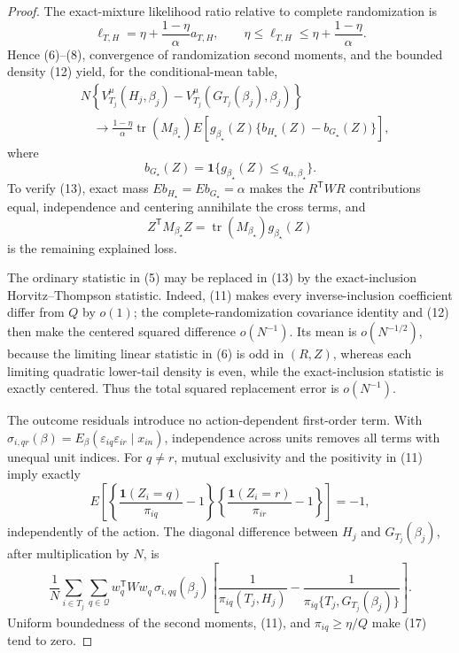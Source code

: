 \documentclass{article}
\begin{document}
\begin{proof}
The exact-mixture likelihood ratio relative to complete randomization is
\[
\ell_{T,H}=\eta+\frac{1-\eta}{\alpha}a_{T,H},
\qquad
\eta\leq\ell_{T,H}\leq\eta+\frac{1-\eta}{\alpha}.
\tag{12}
\]
Hence (6)--(8), convergence of randomization second moments, and the bounded density (12) yield, for the conditional-mean table,
\[
\begin{aligned}
&N\left\{
V_{T_j}^{\mu}(H_j,\beta_j)
-V_{T_j}^{\mu}(G_{T_j}(\beta_j),\beta_j)
\right\}\\
&\quad\longrightarrow
\frac{1-\eta}{\alpha}\operatorname{tr}(M_{\beta_\star})
E\!\left[
g_{\beta_\star}(Z)
\{b_{H_\star}(Z)-b_{G_\star}(Z)\}
\right],
\end{aligned}
\tag{13}
\]
where
\[
b_{G_\star}(Z)
=\mathbf 1\{g_{\beta_\star}(Z)
\leq q_{\alpha,\beta_\star}\}.
\tag{14}
\]
To verify (13), exact mass \(E b_{H_\star}=E b_{G_\star}=\alpha\) makes the \(R^{\mathsf T}WR\) contributions equal, independence and centering annihilate the cross terms, and
\[
Z^{\mathsf T}M_{\beta_\star}Z
=\operatorname{tr}(M_{\beta_\star})g_{\beta_\star}(Z)
\tag{15}
\]
is the remaining explained loss.

The ordinary statistic in (5) may be replaced in (13) by the exact-inclusion Horvitz--Thompson statistic.  Indeed, (11) makes every inverse-inclusion coefficient differ from \(Q\) by \(o(1)\); the complete-randomization covariance identity and (12) then make the centered squared difference \(o(N^{-1})\).  Its mean is \(o(N^{-1/2})\), because the limiting linear statistic in (6) is odd in \((R,Z)\), whereas each limiting quadratic lower-tail density is even, while the exact-inclusion statistic is exactly centered.  Thus the total squared replacement error is \(o(N^{-1})\).

The outcome residuals introduce no action-dependent first-order term.  With
\(\sigma_{i,qr}(\beta)=E_\beta(\varepsilon_{iq}\varepsilon_{ir}\mid x_{in})\), independence across units removes all terms with unequal unit indices.  For \(q\neq r\), mutual exclusivity and the positivity in (11) imply exactly
\[
E\!\left[
\left\{\frac{\mathbf 1(Z_i=q)}{\pi_{iq}}-1\right\}
\left\{\frac{\mathbf 1(Z_i=r)}{\pi_{ir}}-1\right\}
\right]=-1,
\tag{16}
\]
independently of the action.  The diagonal difference between \(H_j\) and \(G_{T_j}(\beta_j)\), after multiplication by \(N\), is
\[
\frac1N\sum_{i\in T_j}\sum_{q\in\mathcal Q}
w_q^{\mathsf T}Ww_q\,\sigma_{i,qq}(\beta_j)
\left[
\frac1{\pi_{iq}(T_j,H_j)}
-\frac1{\pi_{iq}\{T_j,G_{T_j}(\beta_j)\}}
\right].
\tag{17}
\]
Uniform boundedness of the second moments, (11), and \(\pi_{iq}\geq\eta/Q\) make (17) tend to zero.


\end{proof}
\end{document}
